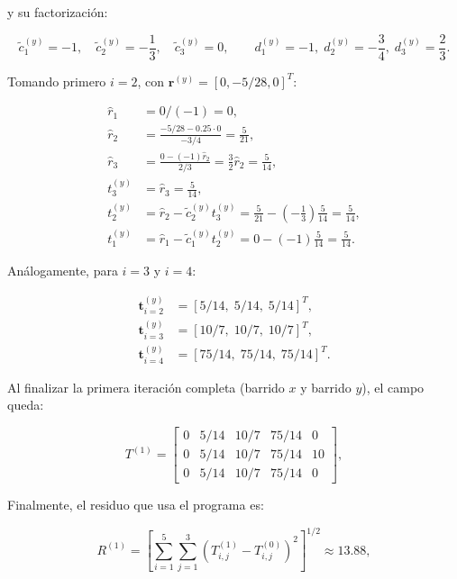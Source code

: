 \documentclass[11pt,a4paper]{article}
\begin{document}
y su factorizaci\'on:

\begin{equation}
\tilde c_1^{(y)}=-1,\quad \tilde c_2^{(y)}=-\frac13,\quad \tilde c_3^{(y)}=0,
\qquad
d_1^{(y)}=-1,\; d_2^{(y)}=-\frac34,\; d_3^{(y)}=\frac23.
\end{equation}

Tomando primero \(i=2\), con \(\mathbf r^{(y)}=[0,-5/28,0]^T\):

\begin{equation}
\begin{aligned}
\hat r_1 &= 0/(-1)=0,\\
\hat r_2 &= \frac{-5/28-0.25\cdot0}{-3/4}=\frac{5}{21},\\
\hat r_3 &= \frac{0-(-1)\hat r_2}{2/3}=\frac{3}{2}\hat r_2=\frac{5}{14},\\
t_3^{(y)} &= \hat r_3=\frac{5}{14},\\
t_2^{(y)} &= \hat r_2-\tilde c_2^{(y)}t_3^{(y)}
=\frac{5}{21}-\left(-\frac13\right)\frac{5}{14}=\frac{5}{14},\\
t_1^{(y)} &= \hat r_1-\tilde c_1^{(y)}t_2^{(y)}
=0-(-1)\frac{5}{14}=\frac{5}{14}.
\end{aligned}
\end{equation}

An\'alogamente, para \(i=3\) y \(i=4\):

\begin{equation}
\begin{aligned}
\mathbf{t}^{(y)}_{i=2} &= [5/14,\;5/14,\;5/14]^T,\\
\mathbf{t}^{(y)}_{i=3} &= [10/7,\;10/7,\;10/7]^T,\\
\mathbf{t}^{(y)}_{i=4} &= [75/14,\;75/14,\;75/14]^T.
\end{aligned}
\end{equation}

Al finalizar la primera iteraci\'on completa (barrido \(x\) y barrido \(y\)), el
campo queda:

\begin{equation}
T^{(1)} =
\begin{bmatrix}
0 & 5/14 & 10/7 & 75/14 & 0 \\
0 & 5/14 & 10/7 & 75/14 & 10 \\
0 & 5/14 & 10/7 & 75/14 & 0
\end{bmatrix},
\end{equation}

Finalmente, el residuo que usa el programa es:

\begin{equation}
R^{(1)} =
\left[
\sum_{i=1}^{5}\sum_{j=1}^{3}
\left(T_{i,j}^{(1)}-T_{i,j}^{(0)}\right)^2
\right]^{1/2}
\approx 13.88,
\end{equation}
\end{document}

